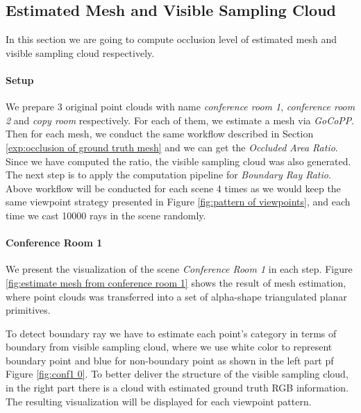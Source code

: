 \documentclass[11pt, a4paper,oneside,chapterprefix=false]{scrbook}
\begin{document}
\subsection{Estimated Mesh and Visible Sampling Cloud}

In this section we are going to compute occlusion level of estimated mesh and visible sampling cloud respectively. 

\paragraph{Setup}

We prepare 3 original point clouds with name \emph{conference room 1}, \emph{conference room 2} and \emph{copy room} respectively. For each of them, we estimate a mesh via \emph{GoCoPP}. Then for each mesh, we conduct the same workflow described in Section \ref{exp:occlusion of ground truth mesh} and we can get the \emph{Occluded Area Ratio}. Since we have computed the ratio, the visible sampling cloud was also generated. The next step is to apply the computation pipeline for \emph{Boundary Ray Ratio}. Above workflow will be conducted for each scene 4 times as we would keep the same viewpoint strategy presented in Figure \ref{fig:pattern of viewpoints}, and each time we cast 10000 rays in the scene randomly.    

\paragraph{Conference Room 1} \label{par:conf1 result}

We present the visualization of the scene \emph{Conference Room 1} in each step. Figure \ref{fig:estimate mesh from conference room 1} shows the result of mesh estimation, where point clouds was transferred into a set of alpha-shape triangulated planar primitives.

\vspace{10pt}

To detect boundary ray 
we have to estimate each point's category in terms of boundary from visible sampling cloud, where we use white color to represent boundary point and blue for non-boundary point as shown in the left part pf Figure \ref{fig:conf1 0}. To better deliver the structure of the visible sampling cloud, in the right part there is a cloud with estimated ground truth RGB information. The resulting visualization will be displayed for each viewpoint pattern.

\vspace{30pt}
\end{document}
